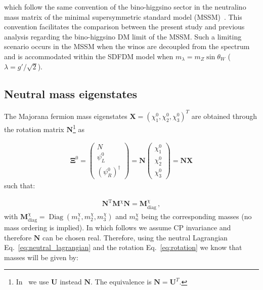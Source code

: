 which follow the same
convention of the bino-higgsino sector in the neutralino mass matrix of the
minimal supersymmetric standard model (MSSM)~\cite{Martin:2012us}. This convention facilitates the comparison between the present study and previous analysis
regarding the bino-higgsino DM limit of the MSSM. 
Such a limiting scenario occurs in the MSSM when the winos are decoupled from the spectrum and is accommodated within the SDFDM model when
$m_\lambda=m_Z\sin\theta_W$ ($\lambda=g'/\sqrt{2}$).




\subsection{Neutral mass eigenstates}
The Majorana fermion mass eigenstates $\mathbf{X}=(\chi_1^0,\chi_2^0,\chi_3^0)^T$ are obtained through the rotation
matrix $\mathbf{N}$\footnote{In~\cite{Horiuchi:2016tqw} we use $\mathbf{U}$ instead $\mathbf{N}$. The equivalence is $\mathbf{N}=\mathbf{U}^T$.} as 


\begin{align}
\label{eq:rotation}
\boldsymbol{\Xi}^0 = \begin{pmatrix}N\\ \psi_L^0 \\ (\psi_R^0)^\dagger\end{pmatrix}= 
\mathbf{N}\begin{pmatrix}\chi_1^0\\ \chi_2^0 \\ \chi_3^0\end{pmatrix}= \mathbf{N}\mathbf{X}
\end{align}
such that:

\begin{align}
\label{eq:chidiag}
 \mathbf{N}^{\operatorname{T}}\mathbf{M}^\chi \mathbf{N}=\mathbf{M}^\chi_\text{diag}\,,
\end{align}
with
$\textbf{M}^\chi_{\text{diag}}=\operatorname{Diag}(m^\chi_1,m^\chi_2,m^\chi_3)$ and $m^\chi_n$ being the corresponding masses (no mass ordering is implied). 
In which follows we assume CP invariance and therefore $\mathbf{N}$ can be chosen real. Therefore, using the neutral Lagrangian Eq.~\eqref{eq:neutral_lagrangian} and the rotation Eq.~\eqref{eq:rotation}  we know that masses will be given by:

